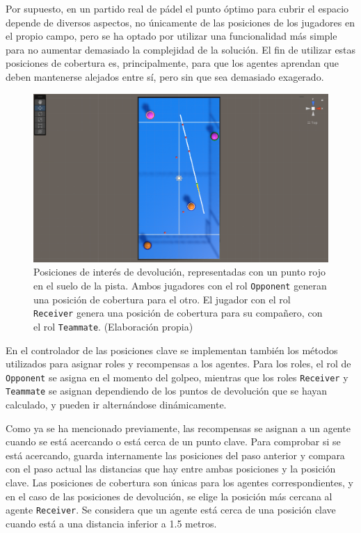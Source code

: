 Por supuesto, en un partido real de pádel el punto óptimo para cubrir el espacio depende de diversos aspectos, no únicamente de las posiciones de los jugadores en el propio campo, pero se ha optado por utilizar una funcionalidad más simple para no aumentar demasiado la complejidad de la solución. El fin de utilizar estas posiciones de cobertura es, principalmente, para que los agentes aprendan que deben mantenerse alejados entre sí, pero sin que sea demasiado exagerado.

\begin{figure}[H]
    \centering
    \includegraphics[width=13cm]{figures/coverage-key-positions.png}
    \caption[Posiciones de interés de cobertura]{Posiciones de interés de devolución, representadas con un punto rojo en el suelo de la pista. Ambos jugadores con el rol \texttt{Opponent} generan una posición de cobertura para el otro. El jugador con el rol \texttt{Receiver} genera una posición de cobertura para su compañero, con el rol \texttt{Teammate}. (Elaboración propia)}
    \label{fig:coverage-keypoints}
\end{figure}

En el controlador de las posiciones clave se implementan también los métodos utilizados para asignar roles y recompensas a los agentes. Para los roles, el rol de \texttt{Opponent} se asigna en el momento del golpeo, mientras que los roles \texttt{Receiver} y \texttt{Teammate} se asignan dependiendo de los puntos de devolución que se hayan calculado, y pueden ir alternándose dinámicamente.

Como ya se ha mencionado previamente, las recompensas se asignan a un agente cuando se está acercando o está cerca de un punto clave. Para comprobar si se está acercando, guarda internamente las posiciones del paso anterior y compara con el paso actual las distancias que hay entre ambas posiciones y la posición clave. Las posiciones de cobertura son únicas para los agentes correspondientes, y en el caso de las posiciones de devolución, se elige la posición más cercana al agente \texttt{Receiver}. Se considera que un agente está cerca de una posición clave cuando está a una distancia inferior a 1.5 metros.

